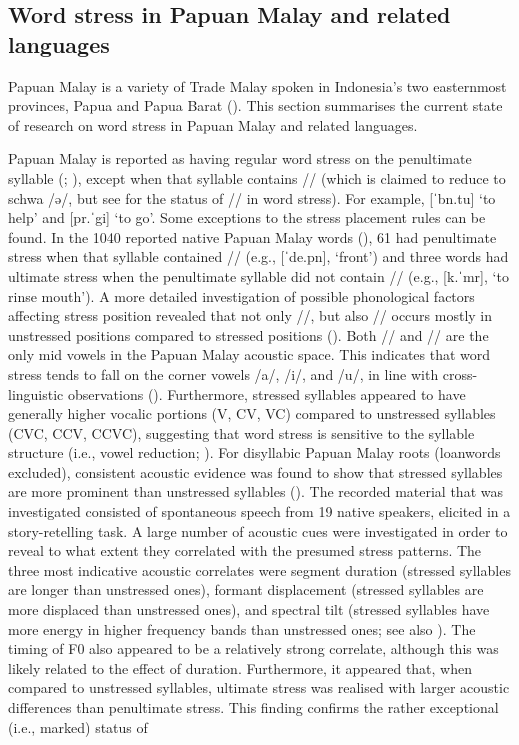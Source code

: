 \subsection{Word stress in Papuan Malay and related languages} \label{sec311}
Papuan Malay is a variety of Trade Malay spoken in Indonesia's two easternmost provinces, Papua and Papua Barat (\citealt{kluge_grammar_2017}). This section summarises the current state of research on word stress in Papuan Malay and related languages.

Papuan Malay is reported as having regular word stress on the penultimate syllable (\citealt{donohue_papuan_2007}; \citealt{kluge_grammar_2017}), except when that syllable contains // (which is claimed to reduce to schwa /ə/, but see  for the status of // in word stress). For example, [ˈbn.tu] `to help' and [pr.ˈgi] `to go'. Some exceptions to the stress placement rules can be found. In the 1040 reported native Papuan Malay words (\citealt{kluge_grammar_2017}), 61 had penultimate stress when that syllable contained // (e.g., [ˈde.pn], `front') and three words had ultimate stress when the penultimate syllable did not contain // (e.g., [k.ˈmr], `to rinse mouth'). A more detailed investigation of possible phonological factors affecting stress position revealed that not only //, but also // occurs mostly in unstressed positions compared to stressed positions (\citealt{kaland_stress_2019}). Both // and // are the only mid vowels in the Papuan Malay acoustic space. This indicates that word stress tends to fall on the corner vowels /a/, /i/, and /u/, in line with cross-linguistic observations (\citealt{crosswhite_vowel_2004}). Furthermore, stressed syllables appeared to have generally higher vocalic portions (V, CV, VC) compared to unstressed syllables (CVC, CCV, CCVC), suggesting that word stress is sensitive to the syllable structure (i.e., vowel reduction; ). For disyllabic Papuan Malay roots (loanwords excluded), consistent acoustic evidence was found to show that stressed syllables are more prominent than unstressed syllables (). The recorded material that was investigated consisted of spontaneous speech from 19 native speakers, elicited in a story-retelling task. A large number of acoustic cues were investigated in order to reveal to what extent they correlated with the presumed stress patterns. The three most indicative acoustic correlates were segment duration (stressed syllables are longer than unstressed ones), formant displacement (stressed syllables are more displaced than unstressed ones), and spectral tilt (stressed syllables have more energy in higher frequency bands than unstressed ones; see also \citealt{kaland_spectral_2018}). The timing of F0 also appeared to be a relatively strong correlate, although this was likely related to the effect of duration. Furthermore, it appeared that, when compared to unstressed syllables, ultimate stress was realised with larger acoustic differences than penultimate stress. This finding confirms the rather exceptional (i.e., marked) status of 